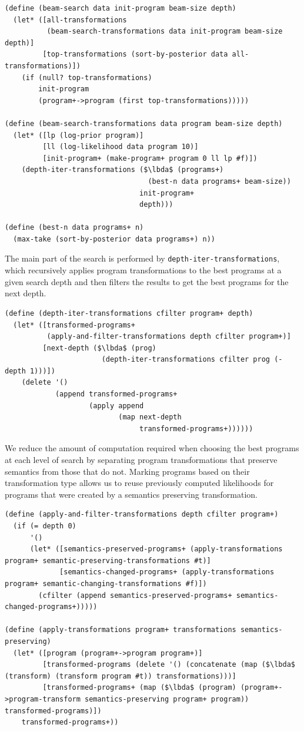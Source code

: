 \documentclass[a4paper,10pt]{article}
\newcommand{\lbda}{\color[rgb]{0,.3,.7} \lambda}
\begin{document}
\begin{lstlisting}[frame=trbl]
(define (beam-search data init-program beam-size depth)
  (let* ([all-transformations
          (beam-search-transformations data init-program beam-size depth)]
         [top-transformations (sort-by-posterior data all-transformations)])
    (if (null? top-transformations)
        init-program
        (program+->program (first top-transformations)))))

(define (beam-search-transformations data program beam-size depth)
  (let* ([lp (log-prior program)]
         [ll (log-likelihood data program 10)]
         [init-program+ (make-program+ program 0 ll lp #f)])
    (depth-iter-transformations ($\lbda$ (programs+)
                                  (best-n data programs+ beam-size))
                                init-program+
                                depth)))

(define (best-n data programs+ n)
  (max-take (sort-by-posterior data programs+) n))
\end{lstlisting}
The main part of the search is performed by \texttt{depth-iter-transformations}, which recursively applies program transformations to the best programs at a given search depth and then filters the results to get the best programs for the next depth.
\begin{lstlisting}[frame=trbl]
(define (depth-iter-transformations cfilter program+ depth)
  (let* ([transformed-programs+
          (apply-and-filter-transformations depth cfilter program+)]
         [next-depth ($\lbda$ (prog)
                       (depth-iter-transformations cfilter prog (- depth 1)))])
    (delete '()
            (append transformed-programs+
                    (apply append
                           (map next-depth
                                transformed-programs+))))))
\end{lstlisting}
We reduce the amount of computation required when choosing the best programs at each level of search by separating program transformations that preserve semantics from those that do not.  Marking programs based on their transformation type allows us to reuse previously computed likelihoods for programs that were created by a semantics preserving transformation.
\begin{lstlisting}[frame=trbl]
(define (apply-and-filter-transformations depth cfilter program+)
  (if (= depth 0)
      '()
      (let* ([semantics-preserved-programs+ (apply-transformations program+ semantic-preserving-transformations #t)]
             [semantics-changed-programs+ (apply-transformations program+ semantic-changing-transformations #f)])
        (cfilter (append semantics-preserved-programs+ semantics-changed-programs+)))))

(define (apply-transformations program+ transformations semantics-preserving)
  (let* ([program (program+->program program+)]
         [transformed-programs (delete '() (concatenate (map ($\lbda$ (transform) (transform program #t)) transformations)))]
         [transformed-programs+ (map ($\lbda$ (program) (program+->program-transform semantics-preserving program+ program)) transformed-programs)])
    transformed-programs+))
\end{lstlisting}
\end{document}
